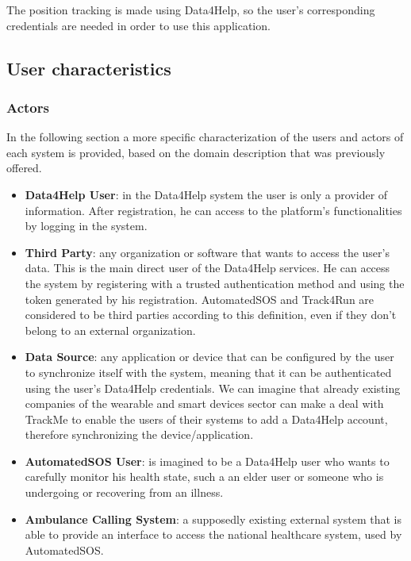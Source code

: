 The position tracking is made using Data4Help, so the user's corresponding credentials are needed in order to use this application.

\subsection{User characteristics}

\subsubsection{Actors}
In the following section a more specific characterization of the users and actors of each system is provided, based on the domain description that was previously offered.

\begin{itemize}
\item \textbf{Data4Help User}: in the Data4Help system the user is only a provider of information. After registration, he can access to the platform's functionalities by logging in the system.
 
\item \textbf{Third Party}: any organization or software that wants to access the user's data. This is the main direct user of the Data4Help services. He can access the system by registering with a trusted authentication method and using the token generated by his registration. 
AutomatedSOS and Track4Run are considered to be third parties according to this definition, even if they don't belong to an external organization.

\item \textbf{Data Source}: any application or device that can be configured by the user to synchronize itself with the system, meaning that it can be authenticated using the user's Data4Help credentials.
We can imagine that already existing companies of the wearable and smart devices sector can make a deal with TrackMe to enable the users of their systems to add a Data4Help account, therefore synchronizing the device/application. 

\item \textbf{AutomatedSOS User}: is imagined to be a Data4Help user who wants to carefully monitor his health state, such a an elder user or someone who is undergoing or recovering from an illness.

\item \textbf{Ambulance Calling System}: a supposedly existing external system that is able to provide an interface to access the national healthcare system, used by AutomatedSOS.


\end{itemize}
